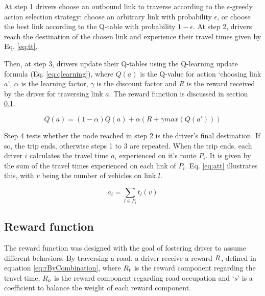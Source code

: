 \documentclass[12pt]{article}
\newcommand{\route}[1]{\ensuremath{P_#1}}	%
\newcommand{\travTime}{\ensuremath{t_l}} 	%
\newcommand{\veh}{\ensuremath{v}}		%
\newcommand{\att}[1]{\ensuremath{a_#1}}		%
\newcommand{\reward}[1][]{\ensuremath{R_#1}}	%
\begin{document}
At step 1 drivers choose an outbound link to traverse according to the $\epsilon$-greedy action selection strategy: choose an arbitrary link with probability $\epsilon$, or choose the best link according to the Q-table with probability $1-\epsilon$. At step 2, drivers reach the destination of the chosen link and experience their travel times given by Eq. \eqref{eq:tt}.


Then, at step 3, drivers update their Q-tables using the Q-learning update formula (Eq. \eqref{eq:qlearning}), where $Q(a)$ is the Q-value for action `choosing link $a$', $\alpha$ is the learning factor, $\gamma$ is the discount factor and $R$ is the reward received by the driver for traversing link $a$. The reward function is discussed in section \ref{sec:reward}.

\begin{equation}
\label{eq:qlearning}
Q(a) = (1 - \alpha) Q(a) + \alpha (R + \gamma max(Q(a')))
\end{equation}



Step 4 tests whether the node reached in step 2 is the driver's final destination. If so, the trip ends, otherwise steps 1 to 3 are repeated. When the trip ends, each driver $i$ calculates the travel time $\att{i}$ experienced on it's route $\route{i}$. It is given by the sum of the travel times experienced on each link of $\route{i}$. Eq. \eqref{eq:att} illustrates this, with $\veh$ being the number of vehicles on link $l$.

\begin{equation}
\label{eq:att}
\att{i} = \sum_{l \in \route{i}} \travTime(\veh)
\end{equation}

\subsection{Reward function}
\label{sec:reward}

The reward function was designed with the goal of fostering driver to assume different behaviors. By traversing a road, a driver receive a reward $\reward{}$, defined in equation \eqref{eq:rByCombination}, where $\reward{t}$ is the reward component regarding the travel time, $\reward{o}$ is the reward component regarding road occupation and `$s$' is a coefficient to balance the weight of each reward component.
\end{document}
